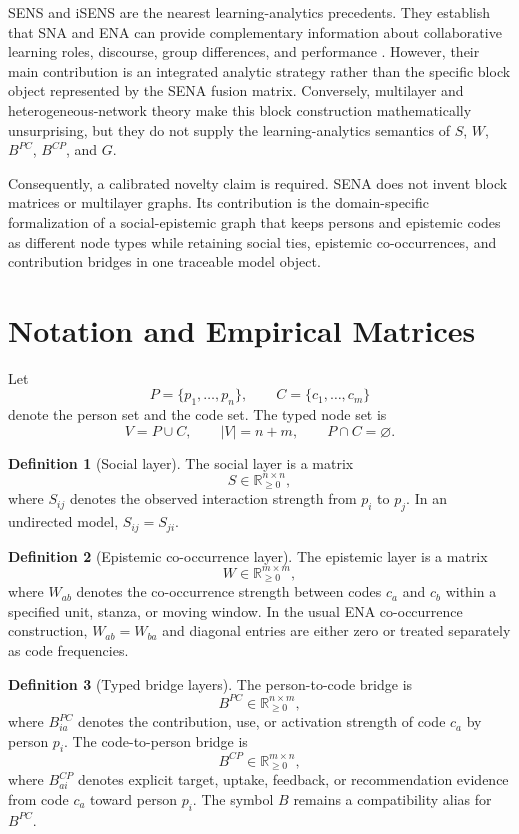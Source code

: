 \documentclass[11pt]{article}
\theoremstyle{definition}
\newtheorem{definition}{Definition}
\newcommand{\Rnn}{\mathbb{R}_{\ge 0}}
\newcommand{\Smat}{S}
\newcommand{\Wmat}{W}
\begin{document}
SENS and iSENS are the nearest learning-analytics precedents. They establish
that SNA and ENA can provide complementary information about collaborative
learning roles, discourse, group differences, and performance
\cite{gasevic2019,swiecki2020}. However, their main contribution is an
integrated analytic strategy rather than the specific block object represented
by the SENA fusion matrix. Conversely, multilayer and heterogeneous-network
theory make this block construction mathematically unsurprising, but they do
not supply the learning-analytics semantics of \(S\), \(W\), \(B^{PC}\),
\(B^{CP}\), and \(G\).

Consequently, a calibrated novelty claim is required. SENA does not invent
block matrices or multilayer graphs. Its contribution is the domain-specific
formalization of a social-epistemic graph that keeps persons and epistemic
codes as different node types while retaining social ties, epistemic
co-occurrences, and contribution bridges in one traceable model object.

\section{Notation and Empirical Matrices}

Let
\[
P=\{p_1,\ldots,p_n\},\qquad C=\{c_1,\ldots,c_m\}
\]
denote the person set and the code set. The typed node set is
\[
V=P\cup C,\qquad |V|=n+m,\qquad P\cap C=\varnothing.
\]

\begin{definition}[Social layer]
The social layer is a matrix
\[
\Smat\in \Rnn^{n\times n},
\]
where \(S_{ij}\) denotes the observed interaction strength from \(p_i\) to
\(p_j\). In an undirected model, \(S_{ij}=S_{ji}\).
\end{definition}

\begin{definition}[Epistemic co-occurrence layer]
The epistemic layer is a matrix
\[
\Wmat\in \Rnn^{m\times m},
\]
where \(W_{ab}\) denotes the co-occurrence strength between codes \(c_a\) and
\(c_b\) within a specified unit, stanza, or moving window. In the usual ENA
co-occurrence construction, \(W_{ab}=W_{ba}\) and diagonal entries are either
zero or treated separately as code frequencies.
\end{definition}

\begin{definition}[Typed bridge layers]
The person-to-code bridge is
\[
B^{PC}\in \Rnn^{n\times m},
\]
where \(B^{PC}_{ia}\) denotes the contribution, use, or activation strength of
code \(c_a\) by person \(p_i\). The code-to-person bridge is
\[
B^{CP}\in \Rnn^{m\times n},
\]
where \(B^{CP}_{ai}\) denotes explicit target, uptake, feedback, or
recommendation evidence from code \(c_a\) toward person \(p_i\). The symbol
\(B\) remains a compatibility alias for \(B^{PC}\).
\end{definition}
\end{document}

